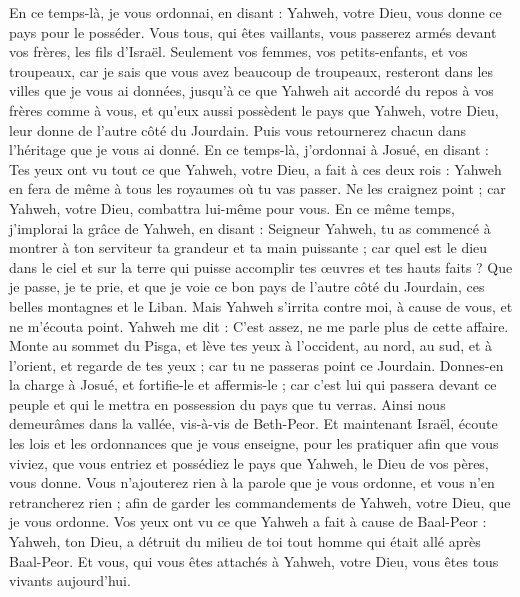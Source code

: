 \begin{multicols}{2}
En ce temps-là, je vous ordonnai, en disant : Yahweh, votre Dieu, vous donne ce pays pour le posséder. Vous tous, qui êtes vaillants, vous passerez armés devant vos frères, les fils d'Israël.
Seulement vos femmes, vos petits-enfants, et vos troupeaux, car je sais que vous avez beaucoup de troupeaux, resteront dans les villes que je vous ai données,
jusqu'à ce que Yahweh ait accordé du repos à vos frères comme à vous, et qu'eux aussi possèdent le pays que Yahweh, votre Dieu, leur donne de l'autre côté du Jourdain. Puis vous retournerez chacun dans l'héritage que je vous ai donné.
En ce temps-là, j'ordonnai à Josué, en disant : Tes yeux ont vu tout ce que Yahweh, votre Dieu, a fait à ces deux rois : Yahweh en fera de même à tous les royaumes où tu vas passer.
Ne les craignez point ; car Yahweh, votre Dieu, combattra lui-même pour vous.
En ce même temps, j'implorai la grâce de Yahweh, en disant :
Seigneur Yahweh, tu as commencé à montrer à ton serviteur ta grandeur et ta main puissante ; car quel est le dieu dans le ciel et sur la terre qui puisse accomplir tes œuvres et tes hauts faits ?
Que je passe, je te prie, et que je voie ce bon pays de l'autre côté du Jourdain, ces belles montagnes et le Liban.
Mais Yahweh s'irrita contre moi, à cause de vous, et ne m'écouta point. Yahweh me dit : C'est assez, ne me parle plus de cette affaire.
Monte au sommet du Pisga, et lève tes yeux à l'occident, au nord, au sud, et à l'orient, et regarde de tes yeux ; car tu ne passeras point ce Jourdain.
Donnes-en la charge à Josué, et fortifie-le et affermis-le ; car c'est lui qui passera devant ce peuple et qui le mettra en possession du pays que tu verras.
Ainsi nous demeurâmes dans la vallée, vis-à-vis de Beth-Peor.
\VerseOne{}Et maintenant Israël, écoute les lois et les ordonnances que je vous enseigne, pour les pratiquer afin que vous viviez, que vous entriez et possédiez le pays que Yahweh, le Dieu de vos pères, vous donne.
Vous n'ajouterez rien à la parole que je vous ordonne, et vous n'en retrancherez rien ; afin de garder les commandements de Yahweh, votre Dieu, que je vous ordonne.
Vos yeux ont vu ce que Yahweh a fait à cause de Baal-Peor : Yahweh, ton Dieu, a détruit du milieu de toi tout homme qui était allé après Baal-Peor.
Et vous, qui vous êtes attachés à Yahweh, votre Dieu, vous êtes tous vivants aujourd'hui.

\end{multicols}
